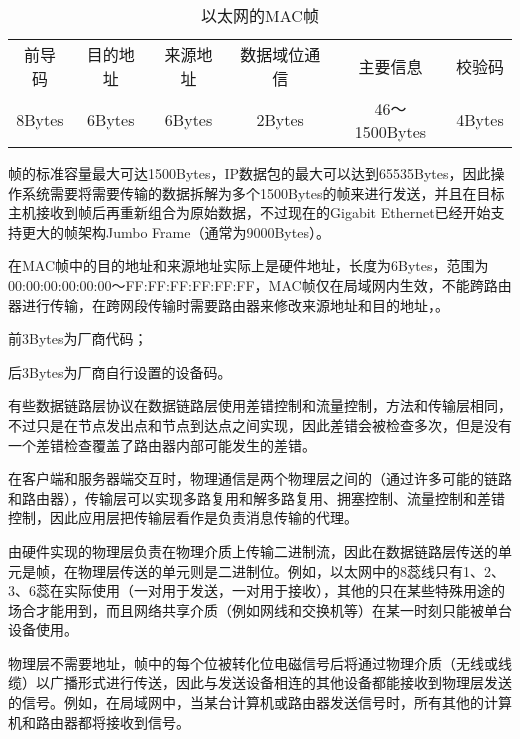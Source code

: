 \begin{table}[htbp]
\centering
\caption{以太网的MAC帧}

\begin{tabular}{|c|c|c|c|c|c|}
\hline
前导码 & 目的地址 & 来源地址 & 数据域位通信 & 主要信息 & 校验码 \\
8Bytes & 6Bytes & 6Bytes & 2Bytes & 46～1500Bytes & 4Bytes\\
\hline
\end{tabular}
\end{table}

帧的标准容量最大可达1500Bytes，IP数据包的最大可以达到65535Bytes，因此操作系统需要将需要传输的数据拆解为多个1500Bytes的帧来进行发送，并且在目标主机接收到帧后再重新组合为原始数据，不过现在的Gigabit Ethernet已经开始支持更大的帧架构Jumbo Frame（通常为9000Bytes）。

在MAC帧中的目的地址和来源地址实际上是硬件地址，长度为6Bytes，范围为00:00:00:00:00:00～FF:FF:FF:FF:FF:FF，MAC帧仅在局域网内生效，不能跨路由器进行传输，在跨网段传输时需要路由器来修改来源地址和目的地址，。

\begin{compactitem}
\item 前3Bytes为厂商代码；
\item 后3Bytes为厂商自行设置的设备码。
\end{compactitem}



有些数据链路层协议在数据链路层使用差错控制和流量控制，方法和传输层相同，不过只是在节点发出点和节点到达点之间实现，因此差错会被检查多次，但是没有一个差错检查覆盖了路由器内部可能发生的差错。

在客户端和服务器端交互时，物理通信是两个物理层之间的（通过许多可能的链路和路由器），传输层可以实现多路复用和解多路复用、拥塞控制、流量控制和差错控制，因此应用层把传输层看作是负责消息传输的代理。

由硬件实现的物理层负责在物理介质上传输二进制流，因此在数据链路层传送的单元是帧，在物理层传送的单元则是二进制位。例如，以太网中的8蕊线只有1、2、3、6蕊在实际使用（一对用于发送，一对用于接收），其他的只在某些特殊用途的场合才能用到，而且网络共享介质（例如网线和交换机等）在某一时刻只能被单台设备使用。





物理层不需要地址，帧中的每个位被转化位电磁信号后将通过物理介质（无线或线缆）以广播形式进行传送，因此与发送设备相连的其他设备都能接收到物理层发送的信号。例如，在局域网中，当某台计算机或路由器发送信号时，所有其他的计算机和路由器都将接收到信号。

